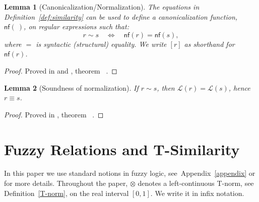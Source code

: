 \documentclass{article}
\newtheorem{lemma}{Lemma}[section]
\begin{document}
\begin{lemma}[Canonicalization/Normalization]\label{def:canonize}
The equations in Definition~\ref{def:similarity} can be used to define a
{\em canonicalization function}, $\mathsf{nf}(\ )$, on regular expressions such that:
\[
  r \sim s \quad\Longleftrightarrow\quad \mathsf{nf}(r)=\mathsf{nf}(s),
\]
where $=$ is syntactic (structural) equality.
We write $[r]$ as shorthand for $\mathsf{nf}(r)$.
\end{lemma}
\begin{proof}
\begin{sloppypar}\raggedright
Proved in  and
, theorem
~\cite{OurRocqRepo}.
\end{sloppypar}
\end{proof}

\begin{lemma}[Soundness of normalization]\label{lem:similarity-sound}
If $r \sim s$, then $\mathcal{L}(r)=\mathcal{L}(s)$, hence $r \equiv s$.
\end{lemma}
\begin{proof}
\begin{sloppypar}\raggedright
Proved in , theorem
~\cite{OurRocqRepo}.
\end{sloppypar}
\end{proof}


\section{Fuzzy Relations and T-Similarity}

In this paper we use standard notions in fuzzy logic, see~Appendix~\ref{appendix} or \cite{met05,Sessa2002} for more details. Throughout the paper, $\otimes$ denotes a left-continuous T-norm, see Definition~\ref{T-norm}, on the real interval $[0,1]$. We write it in infix
notation. 
\end{document}
